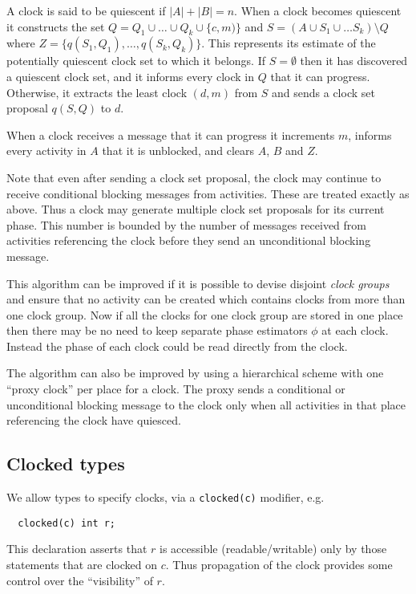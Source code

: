 \documentclass{article}
\begin{document}
{A clock is said to be quiescent if $|A|+|B|=n$.  When a clock becomes
quiescent it constructs the set $Q = Q_1 \cup \ldots \cup Q_k \cup
\{c,m)\}$ and $S = (A \cup S_1 \cup \ldots S_k)\setminus Q$ 
where $Z=\{q(S_1,Q_1),\ldots, q(S_k,Q_k)\}$. This represents its
estimate of the potentially quiescent clock set to which it belongs.
If $S=\emptyset$ then it has discovered a quiescent clock set, and it
informs every clock in $Q$ that it can progress. Otherwise, it
extracts the least clock $(d,m)$ from $S$ and sends a clock set
proposal $q(S, Q)$ to $d$.

When a clock receives a message that it can progress it increments $m$, 
informs every activity in $A$ that it is unblocked, and clears
$A$, $B$ and $Z$.

Note that even after sending a clock set proposal, the clock may
continue to receive conditional blocking messages from
activities. These are treated exactly as above. Thus a clock may
generate multiple clock set proposals for its current phase. This
number is bounded by the number of messages received from activities
referencing the clock before they send an unconditional blocking
message.

This algorithm can be improved if it is possible to devise disjoint
{\em clock groups} and ensure that no activity can be created which
contains clocks from more than one clock group. Now if all the clocks
for one clock group are stored in one place then there may be no need
to keep separate phase estimators $\phi$ at each clock. Instead the
phase of each clock could be read directly from the clock.

The algorithm can also be improved by using a hierarchical scheme with
one ``proxy clock'' per place for a clock. The proxy sends a
conditional or unconditional blocking message to the clock only when
all activities in that place referencing the clock have quiesced.

\subsection{Clocked types}

We allow types to specify clocks, via a {\tt clocked(c)} modifier,
e.g.{}

{\footnotesize
\begin{verbatim}
  clocked(c) int r;
\end{verbatim}}

This declaration asserts that $r$ is accessible (readable/writable) only
by those statements that are clocked on $c$. Thus propagation of the clock provides some control over the ``visibility'' of $r$.

}
\end{document}
